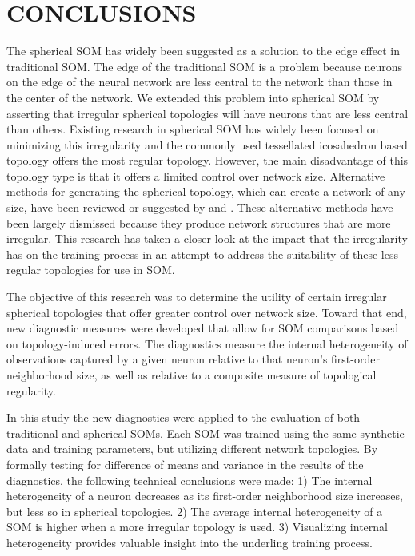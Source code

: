 \chapter{CONCLUSIONS}
The spherical SOM has widely been suggested as a solution to the edge effect
in traditional SOM.  The edge of the traditional SOM is a problem because neurons on
the edge of the neural network are less central to the network than those in
the center of the network.  We extended this problem into spherical SOM by
asserting that irregular spherical topologies will have neurons that are less
central than others.  Existing research in spherical SOM has widely been
focused on minimizing this irregularity and the commonly used tessellated
icosahedron based topology offers the most regular topology. However, the main
disadvantage of this topology type is that it offers a limited control over
network size.  Alternative methods for generating the spherical topology,
which can create a network of any size, have been reviewed or suggested by
\cite{wu2005} and \cite{Nishio:2006fk}.  These alternative methods have been
largely dismissed because they produce network structures that are more irregular.
This research has taken a closer look at the impact that the irregularity has on
the training process in an attempt to address the suitability of these less regular
topologies for use in SOM.

The objective of this research was to determine the utility of certain
irregular spherical topologies that offer greater control over
network size.  Toward that end, new diagnostic measures were developed that
allow for SOM comparisons based on topology-induced errors.  The diagnostics
measure the internal heterogeneity of observations captured by a given neuron
relative to that neuron's first-order neighborhood size, as well as relative
to a composite measure of topological regularity.

In this study the new diagnostics were applied to the evaluation of both
traditional and spherical SOMs. Each SOM was trained using the same synthetic
data and training parameters, but utilizing different network topologies.  By
formally testing for difference of means and variance in the results of the
diagnostics, the following technical conclusions were made: 1) The internal
heterogeneity of a neuron decreases as its first-order neighborhood size
increases, but less so in spherical topologies.  2) The average internal
heterogeneity of a SOM is higher when a more irregular topology is used.  3)
Visualizing internal heterogeneity provides valuable insight into the
underling training process.

